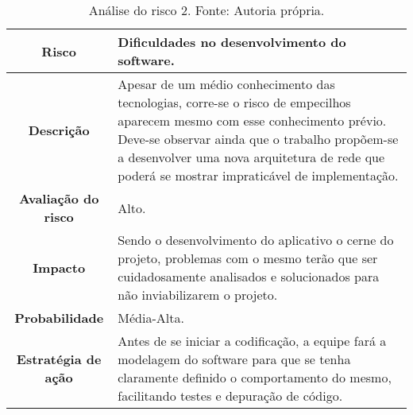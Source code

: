 \begin{table}[h!]
\caption[Análise do risco 2]{Análise do risco 2. Fonte: Autoria própria.}
\begin{center}
\begin{tabular}{|c|p{11cm}|}
\hline
\textbf{Risco} & Dificuldades no desenvolvimento do software. \\
\hline
\textbf{Descrição} & Apesar de um médio conhecimento das tecnologias, corre-se o risco de empecilhos aparecem mesmo com esse conhecimento prévio. Deve-se observar ainda que o trabalho propõem-se a desenvolver uma nova arquitetura de rede que poderá se mostrar impraticável de implementação.\\
\hline
\textbf{Avaliação do risco} & Alto. \\
\hline
\textbf{Impacto} & Sendo o desenvolvimento do aplicativo o cerne do projeto, problemas com o mesmo terão que ser cuidadosamente analisados e solucionados para não inviabilizarem o projeto. \\ 
\hline
\textbf{Probabilidade} & Média-Alta. \\
\hline
\textbf{Estratégia de ação} &  Antes de se iniciar a codificação, a equipe fará a modelagem do software para que se tenha claramente definido o comportamento do mesmo, facilitando testes e depuração de código.	\\
\hline
\end{tabular}%
\end{center}
\label{tab:risco1}
\end{table}

